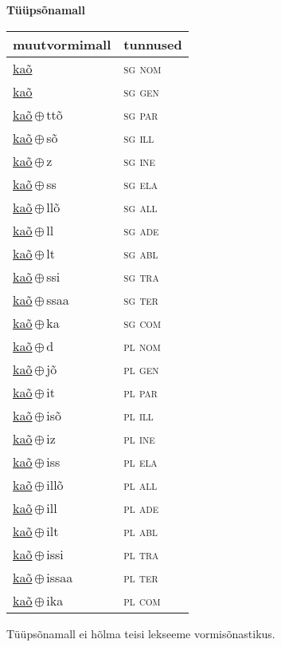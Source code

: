 

\vspace{3.5em}
\noindent \begin{minipage}{\textwidth}
\noindent \textbf{Tüüpsõnamall \,}\\

\begin{sideways}
\begin{tabular}{l l}
muutvormimall & tunnused \\
\hline
\underline{kaõ} & \textsc{ sg nom } \\
\underline{kaõ} & \textsc{ sg gen } \\
\underline{kaõ}\,$\oplus$\,ttõ & \textsc{ sg par } \\
\underline{kaõ}\,$\oplus$\,sõ & \textsc{ sg ill } \\
\underline{kaõ}\,$\oplus$\,z & \textsc{ sg ine } \\
\underline{kaõ}\,$\oplus$\,ss & \textsc{ sg ela } \\
\underline{kaõ}\,$\oplus$\,llõ & \textsc{ sg all } \\
\underline{kaõ}\,$\oplus$\,ll & \textsc{ sg ade } \\
\underline{kaõ}\,$\oplus$\,lt & \textsc{ sg abl } \\
\underline{kaõ}\,$\oplus$\,ssi & \textsc{ sg tra } \\
\underline{kaõ}\,$\oplus$\,ssaa & \textsc{ sg ter } \\
\underline{kaõ}\,$\oplus$\,ka & \textsc{ sg com } \\
\underline{kaõ}\,$\oplus$\,d & \textsc{ pl nom } \\
\underline{kaõ}\,$\oplus$\,jõ & \textsc{ pl gen } \\
\underline{kaõ}\,$\oplus$\,it & \textsc{ pl par } \\
\underline{kaõ}\,$\oplus$\,isõ & \textsc{ pl ill } \\
\underline{kaõ}\,$\oplus$\,iz & \textsc{ pl ine } \\
\underline{kaõ}\,$\oplus$\,iss & \textsc{ pl ela } \\
\underline{kaõ}\,$\oplus$\,illõ & \textsc{ pl all } \\
\underline{kaõ}\,$\oplus$\,ill & \textsc{ pl ade } \\
\underline{kaõ}\,$\oplus$\,ilt & \textsc{ pl abl } \\
\underline{kaõ}\,$\oplus$\,issi & \textsc{ pl tra } \\
\underline{kaõ}\,$\oplus$\,issaa & \textsc{ pl ter } \\
\underline{kaõ}\,$\oplus$\,ika & \textsc{ pl com } \\
\end{tabular}
\end{sideways}
\label{tab:tüüpsõnamall-kaõ}

\end{minipage}

 
\vspace{1em}
\noindent Tüüpsõnamall  ei hõlma teisi lekseeme vormi\-sõnastikus.
